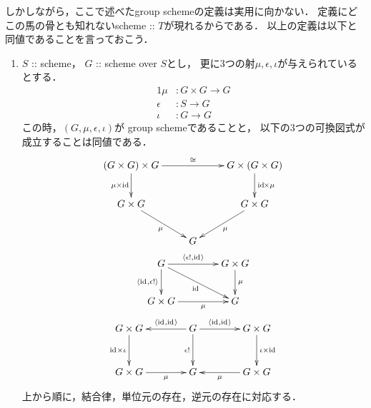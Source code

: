\documentclass[a4paper]{jsarticle}
\begin{document}
    しかしながら，ここで述べたgroup schemeの定義は実用に向かない．
    定義にどこの馬の骨とも知れないscheme :: $T$が現れるからである．
    以上の定義は以下と同値であることを言っておこう．
    \begin{Prop}
    \begin{enumerate}[label=(\roman*),leftmargin=*]
        \item 
        $S$ :: scheme，
        $G$ :: scheme over $S$とし，
        更に3つの射$\mu, \epsilon, \iota$が与えられているとする．
        \begin{alignat*}{1}
            \mu&:       G \times G \to G \\
            \epsilon&:  S \to G          \\
            \iota&:     G \to G         
        \end{alignat*}
        この時，$(G, \mu, \epsilon, \iota)$が
        group schemeであることと，
        以下の3つの可換図式が成立することは同値である．
        \begin{gather}
            \xymatrix
            {
                (G \times G) \times G \ar[d]_-{\mu \times \id} \ar[rr]^-{\iso}&
                {} & G \times (G \times G) \ar[d]^-{\id \times \mu}\\
                G \times G \ar[dr]_-{\mu}& {} & \ar[dl]^-{\mu} G \times G \\
                {} & G & {}
            } \\
            \xymatrix@C=40pt
            {
                G
                    \ar[r]^-{\langle \epsilon!, \id[] \rangle}
                    \ar[d]_-{\langle \id[], \epsilon! \rangle}
                    \ar[rd]_-{\id}&
                G \times G \ar[d]^-{\mu} \\
                G \times G \ar[r]_-{\mu} & G
            } \\
            \xymatrix@R=30pt@C=40pt
            {
                \ar[d]_-{\id[] \times \iota} G \times G &
                G
                    \ar[l]_-{\langle \id[], \id[] \rangle}
                    \ar[d]_-{\epsilon!}
                    \ar[r]^-{\langle \id[], \id[] \rangle}&
                    G \times G \ar[d]^-{\iota \times \id[]}\\
                    G \times G \ar[r]_-{\mu}& G & \ar[l]^-{\mu}G \times G \\
            }
        \end{gather}
        上から順に，結合律，単位元の存在，逆元の存在に対応する．


\end{enumerate}
\end{Prop}
\end{document}
